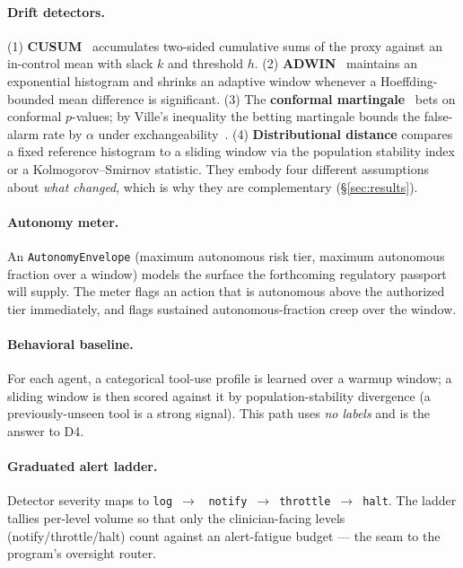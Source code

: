 \documentclass[11pt]{article}
\begin{document}
\paragraph{Drift detectors.} (1) \textbf{CUSUM}~\cite{page1954cusum} accumulates two-sided
cumulative sums of the proxy against an in-control mean with slack $k$ and threshold $h$.
(2) \textbf{ADWIN}~\cite{bifet2007adwin} maintains an exponential histogram and shrinks an
adaptive window whenever a Hoeffding-bounded mean difference is significant. (3) The
\textbf{conformal martingale}~\cite{volkhonskiy2017conformal,vovk2005algorithmic} bets on
conformal $p$-values; by Ville's inequality the betting martingale bounds the false-alarm
rate by $\alpha$ under exchangeability~\cite{shafer2019game}. (4) \textbf{Distributional
distance} compares a fixed reference histogram to a sliding window via the population
stability index or a Kolmogorov--Smirnov statistic. They embody four different assumptions
about \emph{what changed}, which is why they are complementary (\S\ref{sec:results}).

\paragraph{Autonomy meter.} An \texttt{AutonomyEnvelope} (maximum autonomous risk tier,
maximum autonomous fraction over a window) models the surface the forthcoming regulatory
passport will supply. The meter flags an action that is autonomous above the authorized
tier immediately, and flags sustained autonomous-fraction creep over the window.

\paragraph{Behavioral baseline.} For each agent, a categorical tool-use profile is learned
over a warmup window; a sliding window is then scored against it by population-stability
divergence (a previously-unseen tool is a strong signal). This path uses \emph{no labels}
and is the answer to D4.

\paragraph{Graduated alert ladder.} Detector severity maps to \texttt{log}~$\to$~%
\texttt{notify}~$\to$~\texttt{throttle}~$\to$~\texttt{halt}. The ladder tallies per-level
volume so that only the clinician-facing levels (notify/throttle/halt) count against an
alert-fatigue budget --- the seam to the program's oversight router.
\end{document}
